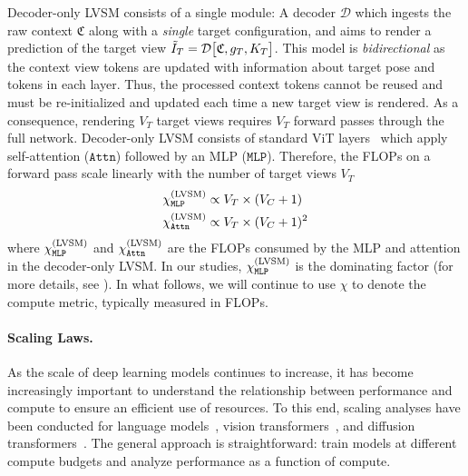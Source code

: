 
Decoder-only LVSM consists of a single module: A decoder $\mathcal D $ which ingests the raw context $\mathfrak C$ along with a \emph{single} target configuration, and aims to render a prediction of the target view $\tilde{I}_T =  \mathcal D \big[\mathfrak C, g_{T}, K_{T}\big]$. This model is \emph{bidirectional} as the context view tokens are updated with information about target pose and tokens in each layer. Thus, the processed context tokens cannot be reused and must be re-initialized and updated each time a new target view is rendered. As a consequence, rendering $V_T$ target views requires $V_T$ forward passes through the full network. 
%
Decoder-only LVSM consists of standard ViT layers~\citep{dosovitskiy2020image} which apply self-attention ($\mathtt{Attn}$) followed by an MLP ($\mathtt{MLP}$). 
Therefore, the FLOPs on a forward pass scale linearly with the number of target views $V_T$
\begin{equation}\label{eqn:lvsm-flops}
\begin{split}
    \chi_{\mathtt{MLP}}^{\text{(LVSM)}} & \propto V_T\times (V_C+1)
    \\
    \chi_{\mathtt{Attn}}^{\text{(LVSM)}} & \propto V_T\times (V_C+1)^2
\end{split}
\end{equation}
where $\chi_{\mathtt{MLP}}^{\text{(LVSM)}}$ and $\chi_{\mathtt{Attn}}^{\text{(LVSM)}}$ are the FLOPs consumed by the MLP and attention in the decoder-only LVSM. In our studies, $\chi_{\mathtt{MLP}}^{\text{(LVSM)}}$ is the dominating factor (for more details, see ). In what follows, we will continue to use $\chi$ to denote the compute metric, typically measured in FLOPs.

\newpage

\paragraph{Scaling Laws.}
%
As the scale of deep learning models continues to increase, it has become increasingly important to understand the relationship between performance and compute to ensure an efficient use of resources. To this end, scaling analyses have been conducted for language models~\citep{hoffmann2022training, kaplan2020scaling}, vision transformers~\citep{zhai2022scaling}, and diffusion transformers~\citep{esser2024scaling, peebles2023scalable}. The general approach is straightforward:  train models at different compute budgets and analyze performance as a function of compute. 

